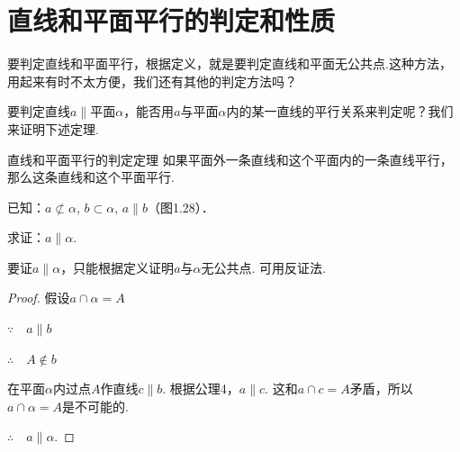 \section{直线和平面平行的判定和性质}
要判定直线和平面平行，根据定义，就是要判定直线和平面无公共点.这种方法，用起来有时不太方便，我们还有其他的判定方法吗？

要判定直线$a\parallel$平面$\alpha$，能否用$a$与平面$\alpha$内的某一直线的平行关系来判定呢？我们来证明下述定理.

\begin{thm}
 {直线和平面平行的判定定理} 如果平面外一条直线和这个平面内的一条直线平行，那么这条直线和这个平面平行.   
\end{thm}

已知：$a\not\subset\alpha$, $b\subset\alpha$, $a\parallel b$（图1.28）．

求证：$a\parallel \alpha$.

\begin{analyze}
    要证$a\parallel \alpha$，只能根据定义证明$a$与$\alpha$无公共点. 可用反证法.
\end{analyze}



\noindent
\begin{minipage}{.6\textwidth}\CTEXindent
    \begin{proof}
        假设$a\cap \alpha=A$
        
        $\because\quad a\parallel b$
        
        $\therefore\quad A\notin b$
        
        在平面$\alpha$内过点$A$作直线$c\parallel b$. 根据公理4，$a\parallel c$. 这和$a\cap c=A$矛盾，所以$a\cap \alpha=A$是不可能的.
        
        $\therefore\quad a\parallel \alpha$.
        \end{proof}
\end{minipage}
\hfill
\begin{minipage}{.38\textwidth}
\centering
{}
\end{minipage}

